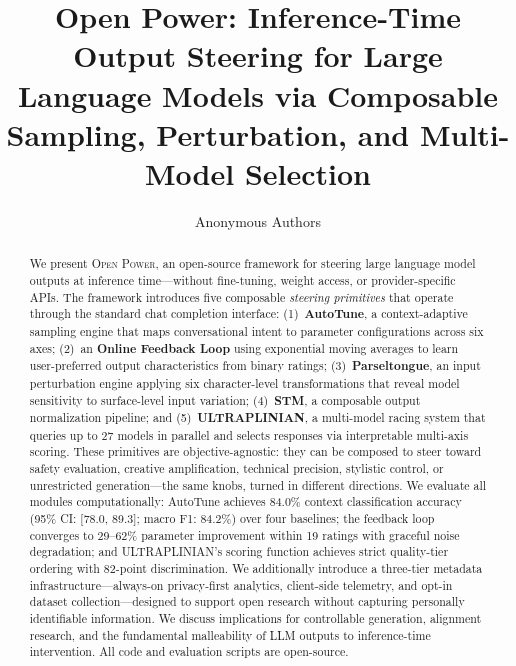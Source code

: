 \documentclass[11pt]{article}
\title{Open Power: Inference-Time Output Steering for Large Language Models via Composable Sampling, Perturbation, and Multi-Model Selection}
\author{
  Anonymous Authors
}
\begin{document}
\maketitle

\begin{abstract}
We present \textsc{Open Power}, an open-source framework for steering large language model outputs at inference time---without fine-tuning, weight access, or provider-specific APIs. The framework introduces five composable \emph{steering primitives} that operate through the standard chat completion interface: (1)~\textbf{AutoTune}, a context-adaptive sampling engine that maps conversational intent to parameter configurations across six axes; (2)~an \textbf{Online Feedback Loop} using exponential moving averages to learn user-preferred output characteristics from binary ratings; (3)~\textbf{Parseltongue}, an input perturbation engine applying six character-level transformations that reveal model sensitivity to surface-level input variation; (4)~\textbf{STM}, a composable output normalization pipeline; and (5)~\textbf{ULTRAPLINIAN}, a multi-model racing system that queries up to 27 models in parallel and selects responses via interpretable multi-axis scoring. These primitives are objective-agnostic: they can be composed to steer toward safety evaluation, creative amplification, technical precision, stylistic control, or unrestricted generation---the same knobs, turned in different directions. We evaluate all modules computationally: AutoTune achieves 84.0\% context classification accuracy (95\% CI: [78.0, 89.3]; macro F1: 84.2\%) over four baselines; the feedback loop converges to 29--62\% parameter improvement within 19 ratings with graceful noise degradation; and ULTRAPLINIAN's scoring function achieves strict quality-tier ordering with 82-point discrimination. We additionally introduce a three-tier metadata infrastructure---always-on privacy-first analytics, client-side telemetry, and opt-in dataset collection---designed to support open research without capturing personally identifiable information. We discuss implications for controllable generation, alignment research, and the fundamental malleability of LLM outputs to inference-time intervention. All code and evaluation scripts are open-source.
\end{abstract}

\end{document}
